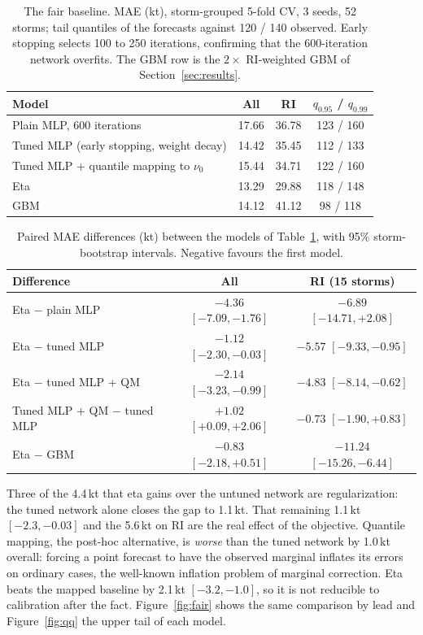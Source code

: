 \documentclass[11pt]{article}
\begin{document}
\begin{table}[t]
\centering
\caption{The fair baseline. MAE (kt), storm-grouped 5-fold CV, 3 seeds, 52 storms; tail
quantiles of the forecasts against 120 / 140 observed. Early stopping selects 100 to 250
iterations, confirming that the 600-iteration network overfits. The GBM row is the $2\times$
RI-weighted GBM of Section~\ref{sec:results}.}
\label{tab:fair}
\begin{tabular}{lccc}
\toprule
Model & All & RI & $q_{0.95}$ / $q_{0.99}$ \\
\midrule
Plain MLP, 600 iterations                 & 17.66 & 36.78 & 123 / 160 \\
Tuned MLP (early stopping, weight decay)  & 14.42 & 35.45 & 112 / 133 \\
Tuned MLP + quantile mapping to $\nu_0$   & 15.44 & 34.71 & 122 / 160 \\
Eta                                       & 13.29 & 29.88 & 118 / 148 \\
GBM                                       & 14.12 & 41.12 &  98 / 118 \\
\bottomrule
\end{tabular}
\end{table}

\begin{table}[t]
\centering
\caption{Paired MAE differences (kt) between the models of Table~\ref{tab:fair}, with 95\%
storm-bootstrap intervals. Negative favours the first model.}
\label{tab:fairdiff}
\begin{tabular}{lcc}
\toprule
Difference & All & RI (15 storms) \\
\midrule
Eta $-$ plain MLP                 & $-4.36$ $[-7.09, -1.76]$ & $-6.89$ $[-14.71, +2.08]$ \\
Eta $-$ tuned MLP                 & $-1.12$ $[-2.30, -0.03]$ & $-5.57$ $[-9.33, -0.95]$ \\
Eta $-$ tuned MLP + QM            & $-2.14$ $[-3.23, -0.99]$ & $-4.83$ $[-8.14, -0.62]$ \\
Tuned MLP + QM $-$ tuned MLP      & $+1.02$ $[+0.09, +2.06]$ & $-0.73$ $[-1.90, +0.83]$ \\
Eta $-$ GBM                       & $-0.83$ $[-2.18, +0.51]$ & $-11.24$ $[-15.26, -6.44]$ \\
\bottomrule
\end{tabular}
\end{table}

Three of the 4.4\,kt that eta gains over the untuned network are regularization: the tuned
network alone closes the gap to 1.1\,kt. That remaining 1.1\,kt $[-2.3, -0.03]$ and the 5.6\,kt
on RI are the real effect of the objective. Quantile mapping, the post-hoc alternative, is
\emph{worse} than the tuned network by 1.0\,kt overall: forcing a point forecast to have the
observed marginal inflates its errors on ordinary cases, the well-known inflation problem of
marginal correction. Eta beats the mapped baseline by 2.1\,kt $[-3.2, -1.0]$, so it is not
reducible to calibration after the fact. Figure~\ref{fig:fair} shows the same comparison by lead
and Figure~\ref{fig:qq} the upper tail of each model.
\end{document}
